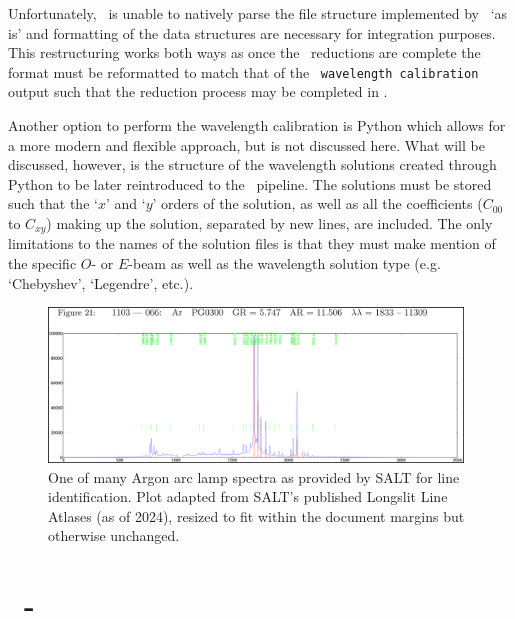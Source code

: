 Unfortunately, \iraf\ is unable to natively parse the file structure implemented by \polsalt\ `as is' and formatting of the data structures are necessary for integration purposes. This restructuring works both ways as once the \iraf\ reductions are complete the format must be reformatted to match that of the \polsalt\ \texttt{wavelength calibration} output such that the reduction process may be completed in \polsalt.

Another option to perform the wavelength calibration is Python which allows for a more modern and flexible approach, but is not discussed here. What will be discussed, however, is the structure of the wavelength solutions created through Python to be later reintroduced to the \polsalt\ pipeline. The solutions must be stored such that the `$x$' and `$y$' orders of the solution, as well as all the coefficients ($C_{00}$ to $C_{xy}$) making up the solution, separated by new lines, are included. The only limitations to the names of the solution files is that they must make mention of the specific $O$- or $E$-beam as well as the wavelength solution type (e.g. `Chebyshev', `Legendre', etc.).

\begin{figure}[t]
    \centering
    \includegraphics[width = 0.98\textwidth]{figures/3_arc_spectrum.png}
    \caption{One of many Argon arc lamp spectra as provided by \gls{SALT} for line identification. Plot adapted from \gls{SALT}'s published Longslit Line Atlases (as of 2024), resized to fit within the document margins but otherwise unchanged.\protect\footnotemark}
    \label{fig:ar_arc_salt}
\end{figure}

\section[\iraf]{\iraf\ - } \label{sec:iraf}

